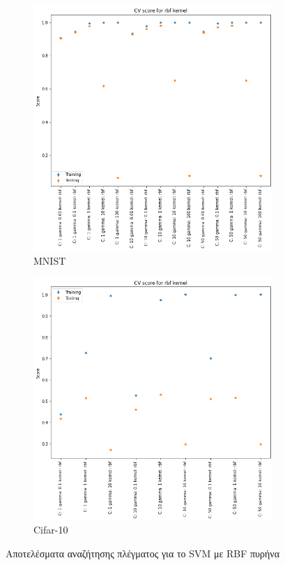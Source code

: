 \documentclass[a4paper]{article}
\begin{document}
\begin{figure}[H]
    \centering

    \begin{subfigure}[t]{0.45\linewidth}
    \includegraphics[width=\linewidth]{figures/mnist/cv_results_rbf.png}
    \caption{MNIST}
    \end{subfigure}
    \begin{subfigure}[t]{0.45\linewidth}
    \includegraphics[width=\linewidth]{figures/cifar/cv_results_rbf.png}
    \caption{Cifar-10}
    \end{subfigure}

    \caption{Αποτελέσματα αναζήτησης πλέγματος για το SVM με RBF πυρήνα}
    \label{fig:cv_rbf}
\end{figure}
\end{document}
